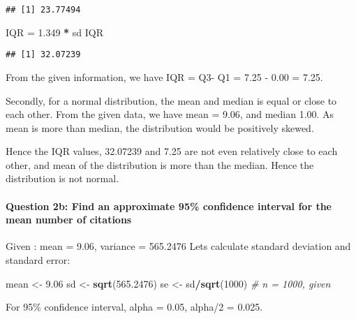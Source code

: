\documentclass[
]{article}
\newenvironment{Shaded}{\begin{snugshade}}{\end{snugshade}}
\newcommand{\CommentTok}[1]{\textcolor[rgb]{0.56,0.35,0.01}{\textit{#1}}}
\newcommand{\DecValTok}[1]{\textcolor[rgb]{0.00,0.00,0.81}{#1}}
\newcommand{\FloatTok}[1]{\textcolor[rgb]{0.00,0.00,0.81}{#1}}
\newcommand{\FunctionTok}[1]{\textcolor[rgb]{0.13,0.29,0.53}{\textbf{#1}}}
\newcommand{\NormalTok}[1]{#1}
\newcommand{\OtherTok}[1]{\textcolor[rgb]{0.56,0.35,0.01}{#1}}
\newcommand{\SpecialCharTok}[1]{\textcolor[rgb]{0.81,0.36,0.00}{\textbf{#1}}}
\begin{document}
\begin{verbatim}
## [1] 23.77494
\end{verbatim}

\begin{Shaded}
\begin{Highlighting}[]
\NormalTok{IQR }\OtherTok{=} \FloatTok{1.349} \SpecialCharTok{*}\NormalTok{ sd}
\NormalTok{IQR}
\end{Highlighting}
\end{Shaded}

\begin{verbatim}
## [1] 32.07239
\end{verbatim}

From the given information, we have IQR = Q3- Q1 = 7.25 - 0.00 = 7.25.

Secondly, for a normal distribution, the mean and median is equal or
close to each other. From the given data, we have mean = 9.06, and
median 1.00. As mean is more than median, the distribution would be
positively skewed.

Hence the IQR values, 32.07239 and 7.25 are not even relatively close to
each other, and mean of the distribution is more than the median. Hence
the distribution is not normal.

\hypertarget{question-2b-find-an-approximate-95-confidence-interval-for-the-mean-number-of-citations}{%
\paragraph{Question 2b: Find an approximate 95\% confidence interval for
the mean number of
citations}\label{question-2b-find-an-approximate-95-confidence-interval-for-the-mean-number-of-citations}}

Given : mean = 9.06, variance = 565.2476 Lets calculate standard
deviation and standard error:

\begin{Shaded}
\begin{Highlighting}[]
\NormalTok{mean }\OtherTok{\textless{}{-}} \FloatTok{9.06}
\NormalTok{sd }\OtherTok{\textless{}{-}} \FunctionTok{sqrt}\NormalTok{(}\FloatTok{565.2476}\NormalTok{)}
\NormalTok{se }\OtherTok{\textless{}{-}}\NormalTok{ sd}\SpecialCharTok{/}\FunctionTok{sqrt}\NormalTok{(}\DecValTok{1000}\NormalTok{)          }\CommentTok{\# n = 1000, given}
\end{Highlighting}
\end{Shaded}

For 95\% confidence interval, alpha = 0.05, alpha/2 = 0.025.
\end{document}
